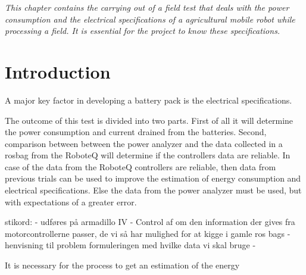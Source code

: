 \textit{
This chapter contains the carrying out of a field test that deals with the power consumption and the electrical specifications of a agricultural mobile robot while processing a field. It is essential for the project to know these specifications.
}%

\section{Introduction}


A major key factor in developing a battery pack is the electrical specifications. 


The outcome of this test is divided into two parts. First of all it will determine the power consumption and current drained from the batteries. Second, comparison between between the power analyzer and the data collected in a rosbag from the RoboteQ will determine if the controllers data are reliable. In case of the data from the RoboteQ controllers are reliable, then data from previous trials can be used to improve the estimation of energy consumption and electrical specifications. Else the data from the power analyzer must be used, but with expectations of a greater error.

stikord:
	- udføres på armadillo IV
	- Control af om den information der gives fra motorcontrollerne passer, de vi så har mulighed for at kigge i gamle ros bags
	- henvisning til problem formuleringen med hvilke data vi skal bruge
	- 



It is necessary for the process to get an estimation of the energy 